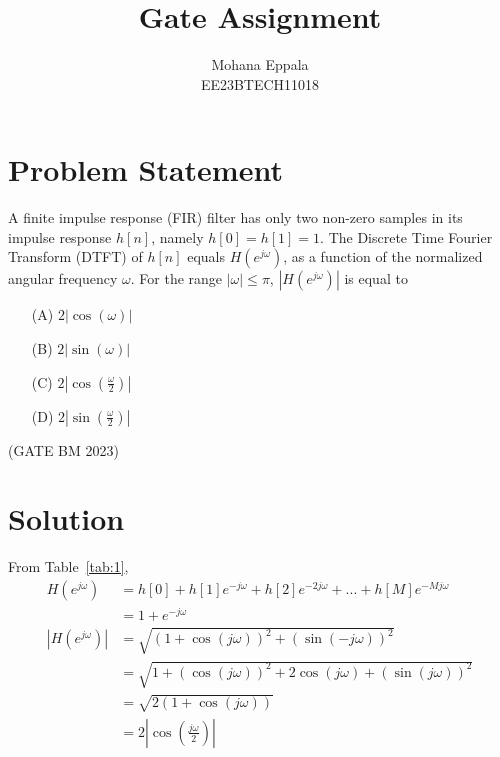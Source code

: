 \documentclass[12pt]{article}
\newcommand{\tabref}[1]{Table~\ref{#1}}
\providecommand{\abs}[1]{\left\vert#1\right\vert}
\begin{document}
\title{Gate Assignment}
\author{Mohana Eppala\\ EE23BTECH11018}
\maketitle

\section*{Problem Statement}
A finite impulse response (FIR) filter has only two non-zero samples in its impulse response $h[n]$, namely $h[0] = h[1] = 1$. The Discrete Time Fourier Transform (DTFT) of $h[n]$ equals $H(e^{j\omega})$, as a function of the normalized angular frequency $\omega$. For the range $\abs{\omega} \leq \pi$, $\abs{H(e^{j\omega})}$ is equal to
\begin{enumerate}
	\item[(A)] $2\abs{\cos(\omega)}$
	\item[(B)] $2\abs{\sin(\omega)}$
	\item[(C)] $2\abs{\cos(\frac{\omega}{2})}$
	\item[(D)] $2\abs{\sin(\frac{\omega}{2})}$
\end{enumerate}
\hfill(GATE BM 2023)


\section*{Solution}
\begin{table}[H]
	
\end{table}
From \tabref{tab:1},
\begin{align}
	H(e^{j\omega}) &= h[0] + h[1]e^{-j\omega} + h[2]e^{-2j\omega} +...+h[M]e^{-Mj\omega} \\
	&= 1 + e^{-j\omega} \\
	\abs{H(e^{j\omega})} &= \sqrt{(1+\cos{(j\omega)})^{2} + (\sin{(-j\omega)})^{2}} \\
	&= \sqrt{1+(\cos{(j\omega)})^{2}+2\cos{(j\omega)}+(\sin{(j\omega)})^{2}} \\
	&= \sqrt{2(1+\cos{(j\omega)})} \\
	&= 2\abs{\cos{(\frac{j\omega}{2})}}
\end{align}
\end{document}
